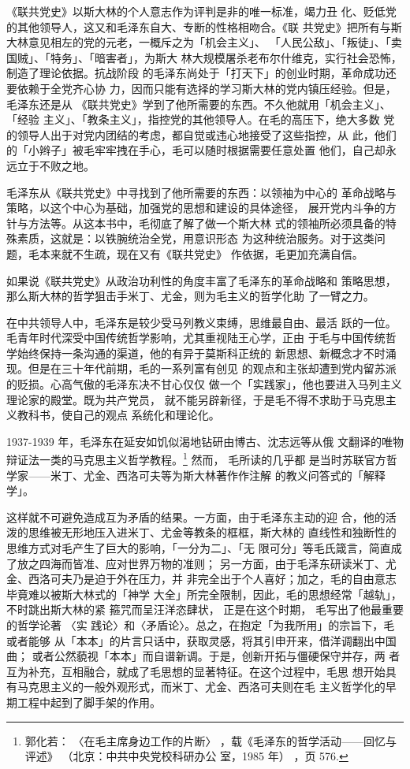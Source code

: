 《联共党史》以斯大林的个人意志作为评判是非的唯一标准，竭力丑
化、贬低党的其他领导人，这又和毛泽东自大、专断的性格相吻合。《联
共党史》把所有与斯大林意见相左的党的元老，一概斥之为「机会主义」、
「人民公敌」、「叛徒」、「卖国贼」、「特务」、「暗害者」，为斯大
林大规模屠杀老布尔什维克，实行社会恐怖，制造了理论依据。抗战阶段
的毛泽东尚处于「打天下」的创业时期，革命成功还要依赖于全党齐心协
力，因而只能有选择的学习斯大林的党内镇压经验。但是，毛泽东还是从
《联共党史》学到了他所需要的东西。不久他就用「机会主义」、「经验
主义」、「教条主义」，指控党的其他领导人。在毛的高压下，绝大多数
党的领导人出于对党内团结的考虑，都自觉或违心地接受了这些指控，从
此，他们的「小辫子」被毛牢牢拽在手心，毛可以随时根据需要任意处置
他们，自己却永远立于不败之地。

毛泽东从《联共党史》中寻找到了他所需要的东西：以领袖为中心的
革命战略与策略，以这个中心为基础，加强党的思想和建设的具体途径，
展开党内斗争的方针与方法等。从这本书中，毛彻底了解了做一个斯大林
式的领袖所必须具备的特殊素质，这就是：以铁腕统治全党，用意识形态
为这种统治服务。对于这类问题，毛本来就不生疏，现在又有《联共党史》
作依据，毛更加充满自信。

如果说《联共党史》从政治功利性的角度丰富了毛泽东的革命战略和
策略思想，那么斯大林的哲学狙击手米丁、尤金，则为毛主义的哲学化助
了一臂之力。

在中共领导人中，毛泽东是较少受马列教义束缚，思维最自由、最活
跃的一位。毛青年时代深受中国传统哲学影响，尤其重视陆王心学，正由
于毛与中国传统哲学始终保持一条沟通的渠道，他的有异于莫斯科正统的
新思想、新概念才不时涌现。但是在三十年代前期，毛的一系列富有创见
的观点和主张却遭到党内留苏派的贬损。心高气傲的毛泽东决不甘心仅仅
做一个「实践家」，他也要进入马列主义理论家的殿堂。既为共产党员，
就不能另辟新径，于是毛不得不求助于马克思主义教科书，使自己的观点
系统化和理论化。

1937-1939 年，毛泽东在延安如饥似渴地钻研由博古、沈志远等从俄
文翻译的唯物辩证法一类的马克思主义哲学教程。\footnote{郭化若：
〈在毛主席身边工作的片断〉
，载《毛泽东的哲学活动——回忆与评述》
（北京：中共中央党校科研办公
室，1985 年）
，页 576.} 然而，
毛所读的几乎都
是当时苏联官方哲学家——米丁、尤金、西洛可夫等为斯大林著作作注解
的教义问答式的「解释学」。

这样就不可避免造成互为矛盾的结果。一方面，由于毛泽东主动的迎
合，他的活泼的思维被无形地压入进米丁、尤金等教条的框框，斯大林的
直线性和独断性的思维方式对毛产生了巨大的影响，「一分为二」、「无
限可分」等毛氏箴言，简直成了放之四海而皆准、应对世界万物的准则；
另一方面，由于毛泽东研读米丁、尤金、西洛可夫乃是迫于外在压力，并
非完全出于个人喜好；加之，毛的自由意志毕竟难以被斯大林式的「神学
大全」所完全限制，因此，毛的思想经常「越轨」，不时跳出斯大林的紧
箍咒而呈汪洋恣肆状，
正是在这个时期，
毛写出了他最重要的哲学论著
〈实
践论〉和〈矛盾论〉。总之，在抱定「为我所用」的宗旨下，毛或者能够
从「本本」的片言只话中，获取灵感，将其引申开来，借洋调翻出中国曲；
或者公然藐视「本本」而自谱新调。于是，创新开拓与僵硬保守并存，两
者互为补充，互相融合，就成了毛思想的显著特征。在这个过程中，毛思
想开始具有马克思主义的一般外观形式，而米丁、尤金、西洛可夫则在毛
主义哲学化的早期工程中起到了脚手架的作用。

